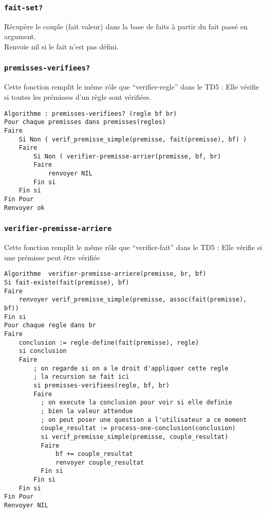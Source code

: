 \documentclass[a4paper, 12pt, final]{article}
\begin{document}
\subsubsection{\texttt{fait-set?}}

Récupère le couple (fait valeur)
dans la base de faits à partir du fait passé en argument.\\
Renvoie nil si le fait n'est pas défini.

\subsubsection{\texttt{premisses-verifiees?}}

Cette fonction remplit le même rôle que ``verifier-regle'' dans le
TD5 : Elle vérifie si toutes les prémisses d'un règle sont vérifiées.

\begin{verbatim}
Algorithme : premisses-verifiees? (regle bf br)
Pour chaque premisses dans premisses(regles)
Faire
    Si Non ( verif_premisse_simple(premisse, fait(premisse), bf) )
    Faire
        Si Non ( verifier-premisse-arrier(premisse, bf, br)
        Faire
            renvoyer NIL
        Fin si
    Fin si
Fin Pour
Renvoyer ok
\end{verbatim}

\subsubsection{\texttt{verifier-premisse-arriere}}
Cette fonction remplit le même rôle que ``verifier-fait'' dans le
TD5 : Elle vérifie si une prémisse peut être vérifiée 
\begin{verbatim}
Algorithme  verifier-premisse-arriere(premisse, br, bf)
Si fait-existe(fait(premisse), bf)
Faire
    renvoyer verif_premisse_simple(premisse, assoc(fait(premisse), bf))
Fin si
Pour chaque regle dans br
Faire
    conclusion := regle-define(fait(premisse), regle)
    si conclusion
    Faire
        ; on regarde si on a le droit d'appliquer cette regle
        ; la recursion se fait ici
        si premisses-verifiees(regle, bf, br)
        Faire
          ; on execute la conclusion pour voir si elle definie
          ; bien la valeur attendue
          ; on peut poser une question a l'utilisateur a ce moment
          couple_resultat := process-one-conclusion(conclusion)
          si verif_premisse_simple(premisse, couple_resultat)
          Faire
              bf += couple_resultat
              renvoyer couple_resultat
          Fin si
        Fin si
    Fin si
Fin Pour
Renvoyer NIL
\end{verbatim}
\end{document}
